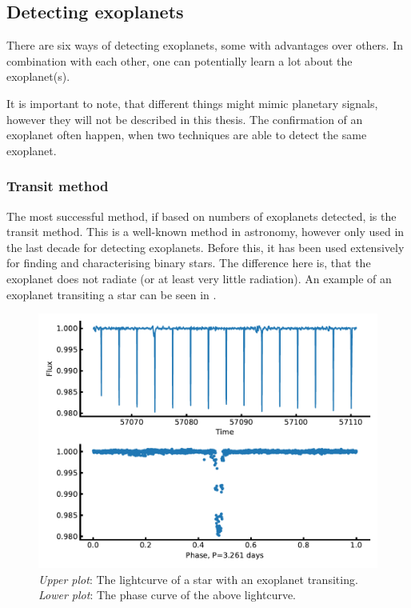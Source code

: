 \subsection{Detecting exoplanets}
\label{sec:detecting_exoplanets}

There are six ways of detecting exoplanets, some with advantages over others. In combination with
each other, one can potentially learn a lot about the exoplanet(s).

It is important to note, that different things might mimic planetary signals, however they will not
be described in this thesis. The confirmation of an exoplanet often happen, when two techniques are
able to detect the same exoplanet.



\subsubsection{Transit method}
\label{sec:transitMethod}

The most successful method, if based on numbers of exoplanets detected, is the transit method. This
is a well-known method in astronomy, however only used in the last decade for detecting exoplanets.
Before this, it has been used extensively for finding and characterising binary stars. The
difference here is, that the exoplanet does not radiate (or at least very little radiation). An
example of an exoplanet transiting a star can be seen in .

\begin{figure}[htpb!]
    \centering
    \includegraphics[width=1.0\linewidth]{figures/transitMethod.pdf}
    \caption{\emph{Upper plot}: The lightcurve of a star with an exoplanet transiting.
             \emph{Lower plot}: The phase curve of the above lightcurve.}
    \label{fig:transitMethod}
\end{figure}

